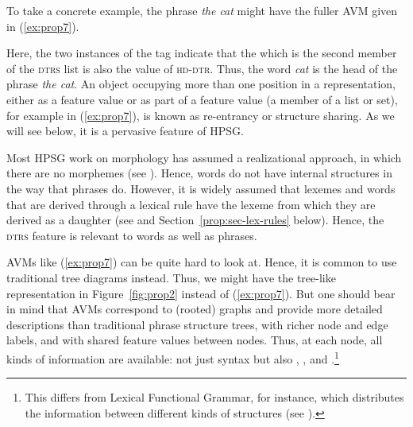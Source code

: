 \documentclass[output=paper,biblatex,babelshorthands,newtxmath,draftmode,colorlinks,citecolor=brown]{langscibook}
\begin{document}
\begin{multicols}{2}
\eal\label{ex:prop6}
\ex\label{ex:prop6a}

\columnbreak
\ex\label{ex:prop6b}
\zl
\end{multicols}
%
To take a concrete example, the phrase \emph{the cat} might have the fuller AVM given in (\ref{ex:prop7}).

\ea\label{ex:prop7}
\z

\noindent
Here, the two instances of the tag  indicate that the  which is the
second member of the \textsc{dtrs} list is also the value of \textsc{hd-dtr}. Thus, the word
\emph{cat} is the head of the phrase \emph{the cat}. An object occupying more than one position in a
representation, either as a feature value or as part of a feature value (a member of a list or set),
for example  in (\ref{ex:prop7}), is known as re-entrancy or structure sharing. As we will
see below, it is a pervasive feature of HPSG. 

Most HPSG work on morphology has assumed a realizational approach, in which there are no morphemes
(see ). Hence, words do not have internal structures in the way that
phrases do. However, it is widely assumed that lexemes and words that are derived through a lexical
rule have the lexeme from which they are derived as a daughter (see \citealt{BC99a,Meurers2001a} and
Section~\ref{prop:sec-lex-rules} below). Hence, the \textsc{dtrs} feature is relevant to words as
well as phrases. 

AVMs like (\ref{ex:prop7}) can be quite hard to look at. Hence, it is common to use traditional tree
diagrams instead. Thus, we might have the tree-like representation in Figure~\ref{fig:prop2} instead
of (\ref{ex:prop7}). But one should bear in mind that AVMs correspond to (rooted) graphs and provide
more detailed descriptions than traditional phrase structure trees, with richer node and edge
labels, and with shared feature values between nodes. Thus, at each node, all kinds of information
are available: not just syntax but also , , and .\footnote{%
 This differs from Lexical Functional Grammar\indexlfg, for instance, which distributes the
 information between different kinds of structures (see ).}
%
\end{document}
